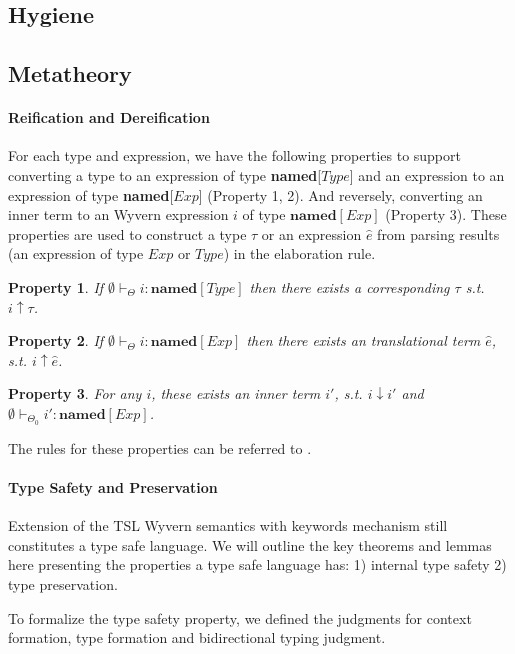 \documentclass{sig-alternate}
\newtheorem{property}{Property}
\begin{document}
\subsection{Hygiene}

\subsection{Metatheory}
\paragraph{Reification and Dereification}
For each type and expression, we have the following properties to support converting a type to an expression of type \textbf{named}[$Type$] and an expression to an expression of type \textbf{named}[$Exp$] (Property 1, 2). And reversely, converting an inner term to an Wyvern expression $i$ of type $\mathbf{named}[Exp]$ (Property 3). These properties are used to construct a type $\tau$ or an expression $\hat{e}$ from parsing results (an expression of type $Exp$ or $Type$) in the elaboration rule. 
\begin{property}If $\emptyset\vdash_{\Theta} i:\mathbf{named}[Type]$ then there exists a corresponding $\tau$ s.t. $i\uparrow\tau$. 
\end{property}
\begin{property}
If $\emptyset\vdash_{\Theta} i:\mathbf{named}[Exp]$ then there exists an translational term $\hat{e}$, s.t. $i\uparrow\hat{e}$.
\end{property}

\begin{property}
For any $i$, these exists an inner term $i'$, s.t. $i\downarrow i'$ and $\emptyset\vdash_{\Theta_0} i':\mathbf{named}[Exp]$.
\end{property}
The rules for these properties can be referred to .

\paragraph{Type Safety and Preservation}
Extension of the TSL Wyvern semantics with keywords mechanism still constitutes a type safe language. We will outline the key theorems and lemmas here presenting the properties a type safe language has: 1) internal type safety 2) type preservation. 

To formalize the type safety property, we defined the judgments for context formation, type formation and bidirectional typing judgment. 
\end{document}
